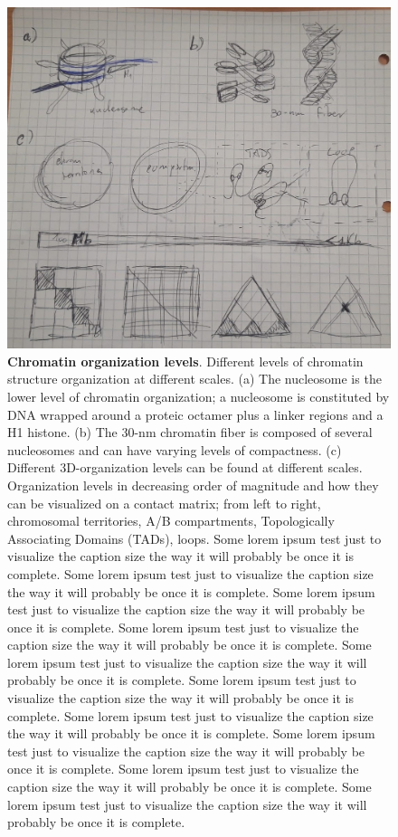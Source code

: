 \begin{figure}
  \centering
  \includegraphics[width=1\textwidth]{chromatin_organization.jpeg}
  \caption{\textbf{Chromatin organization levels}. Different levels of chromatin structure organization at different scales. (a) The nucleosome is the lower level of chromatin organization; a nucleosome is constituted by DNA wrapped around a proteic octamer plus a linker regions and a H1 histone. (b) The 30-nm chromatin fiber is composed of several nucleosomes and can have varying levels of compactness. (c) Different 3D-organization levels can be found at different scales. Organization levels in decreasing order of magnitude and how they can be visualized on a contact matrix; from left to right, chromosomal territories, A/B compartments, Topologically Associating Domains (TADs), loops. Some lorem ipsum test just to visualize the caption size the way it will probably be once it is complete. Some lorem ipsum test just to visualize the caption size the way it will probably be once it is complete. Some lorem ipsum test just to visualize the caption size the way it will probably be once it is complete. Some lorem ipsum test just to visualize the caption size the way it will probably be once it is complete. Some lorem ipsum test just to visualize the caption size the way it will probably be once it is complete. Some lorem ipsum test just to visualize the caption size the way it will probably be once it is complete. Some lorem ipsum test just to visualize the caption size the way it will probably be once it is complete. Some lorem ipsum test just to visualize the caption size the way it will probably be once it is complete. Some lorem ipsum test just to visualize the caption size the way it will probably be once it is complete. Some lorem ipsum test just to visualize the caption size the way it will probably be once it is complete.}
  \label{fig:chromatin}
\end{figure}

